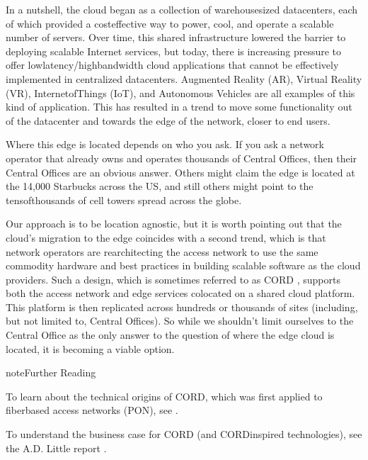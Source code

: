 \documentclass[a4paper,11pt,english]{sphinxmanual}
\begin{document}
\sphinxAtStartPar
In a nutshell, the cloud began as a collection of warehouse\sphinxhyphen{}sized
datacenters, each of which provided a cost\sphinxhyphen{}effective way to power, cool,
and operate a scalable number of servers. Over time, this shared
infrastructure lowered the barrier to deploying scalable Internet
services, but today, there is increasing pressure to offer
low\sphinxhyphen{}latency/high\sphinxhyphen{}bandwidth cloud applications that cannot be effectively
implemented in centralized datacenters. Augmented Reality (AR), Virtual
Reality (VR), Internet\sphinxhyphen{}of\sphinxhyphen{}Things (IoT), and Autonomous Vehicles are all
examples of this kind of application. This has resulted in a trend to
move some functionality out of the datacenter and towards the edge of
the network, closer to end users.

\sphinxAtStartPar
Where this edge is  located depends on who you ask. If you
ask a network operator that already owns and operates thousands of
Central Offices, then their Central Offices are an obvious answer.
Others might claim the edge is located at the 14,000 Starbucks across
the US, and still others might point to the tens\sphinxhyphen{}of\sphinxhyphen{}thousands of cell
towers spread across the globe.

\sphinxAtStartPar
Our approach is to be location agnostic, but it is worth pointing out
that the cloud’s migration to the edge coincides with a second trend,
which is that network operators are re\sphinxhyphen{}architecting the access network
to use the same commodity hardware and best practices in building
scalable software as the cloud providers. Such a design, which is
sometimes referred to as CORD , supports both the access network and edge services
co\sphinxhyphen{}located on a shared cloud platform. This platform is then replicated
across hundreds or thousands of sites (including, but not limited to,
Central Offices). So while we shouldn’t limit ourselves to the Central
Office as the only answer to the question of where the edge cloud is
located, it is becoming a viable option.

\label{\detokenize{intro:reading-cord}}
\begin{sphinxadmonition}{note}{Further Reading}

\sphinxAtStartPar
To learn about the technical origins of CORD, which was first
applied to fiber\sphinxhyphen{}based access networks (PON), see .

\sphinxAtStartPar
To understand the business case for CORD (and CORD\sphinxhyphen{}inspired
technologies), see the A.D. Little report .
\end{sphinxadmonition}
\end{document}
